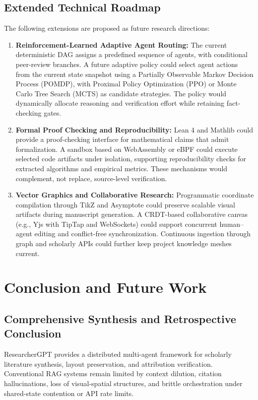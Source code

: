 \documentclass[conference]{IEEEtran}
\begin{document}
\subsection{Extended Technical Roadmap}
The following extensions are proposed as future research directions:
\begin{enumerate}
\item \textbf{Reinforcement-Learned Adaptive Agent Routing:} The current deterministic DAG assigns a predefined sequence of agents, with conditional peer-review branches. A future adaptive policy could select agent actions from the current state snapshot using a Partially Observable Markov Decision Process (POMDP), with Proximal Policy Optimization (PPO) or Monte Carlo Tree Search (MCTS) as candidate strategies. The policy would dynamically allocate reasoning and verification effort while retaining fact-checking gates.
\item \textbf{Formal Proof Checking and Reproducibility:} Lean 4 and Mathlib could provide a proof-checking interface for mathematical claims that admit formalization. A sandbox based on WebAssembly or eBPF could execute selected code artifacts under isolation, supporting reproducibility checks for extracted algorithms and empirical metrics. These mechanisms would complement, not replace, source-level verification.
\item \textbf{Vector Graphics and Collaborative Research:} Programmatic coordinate compilation through TikZ and Asymptote could preserve scalable visual artifacts during manuscript generation. A CRDT-based collaborative canvas (e.g., Yjs with TipTap and WebSockets) could support concurrent human--agent editing and conflict-free synchronization. Continuous ingestion through graph and scholarly APIs could further keep project knowledge meshes current.
\end{enumerate}

\section{Conclusion and Future Work}

\subsection{Comprehensive Synthesis and Retrospective Conclusion}
ResearcherGPT provides a distributed multi-agent framework for scholarly literature synthesis, layout preservation, and attribution verification. Conventional RAG systems remain limited by context dilution, citation hallucinations, loss of visual-spatial structures, and brittle orchestration under shared-state contention or API rate limits.
\end{document}
